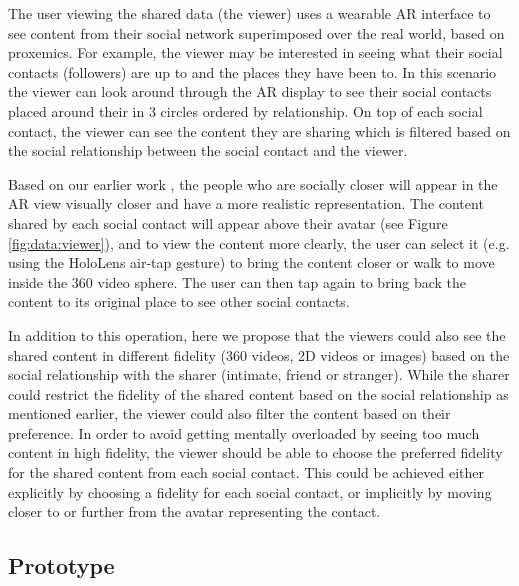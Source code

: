 The user viewing the shared data (the viewer) uses a wearable AR interface to see content from their social network superimposed over the real world, based on proxemics. For example, the viewer may be interested in seeing what their social contacts (followers) are up to and the places they have been to. In this scenario the viewer can look around through the AR display to see their social contacts placed around their in 3 circles ordered by relationship. On top of each social contact, the viewer can see the content they are sharing which is filtered based on the social relationship between the social contact and the viewer.

Based on our earlier work \cite{Nassani2017a}, the people who are socially closer will appear in the AR view visually closer and have a more realistic representation. The content shared by each social contact will appear above their avatar (see Figure \ref{fig:data:viewer}), and to view the content more clearly, the user can select it (e.g. using the HoloLens air-tap gesture) to bring the content closer or walk to move inside the 360 video sphere. The user can then tap again to bring back the content to its original place to see other social contacts. 

In addition to this operation, here we propose that the viewers could also see the shared content in different fidelity (360 videos, 2D videos or images) based on the social relationship with the sharer (intimate, friend or stranger). While the sharer could restrict the fidelity of the shared content based on the social relationship as mentioned earlier, the viewer could also filter the content based on their preference. In order to avoid getting mentally overloaded by seeing too much content in high fidelity, the viewer should be able to choose the preferred fidelity for the shared content from each social contact. This could be achieved either explicitly by choosing a fidelity for each social contact, or implicitly by moving closer to or further from the avatar representing the contact.      

\subsection{Prototype}

